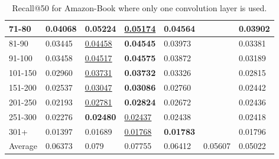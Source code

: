 \begin{table*}[]
\begin{tabular}{|l|l|l|l|l|l|l|}
        71-80     & 0.04068                        & \textbf{0.05224}               & \underline{0.05174}            & 0.04564                        &                                & 0.03902                        \\ \hline
        81-90     & 0.03445                        & \underline{0.04458}            & \textbf{0.04545}               & 0.03973                        &                                & 0.03381                        \\ \hline
        91-100    & 0.03458                        & \underline{0.04517}            & \textbf{0.04575}               & 0.03872                        &                                & 0.03189                        \\ \hline
        101-150   & 0.02960                        & \underline{0.03731}            & \textbf{0.03732}               & 0.03326                        &                                & 0.02815                        \\ \hline
        151-200   & 0.02537                        & \underline{0.03047}            & \textbf{0.03086}               & 0.02760                        &                                & 0.02442                        \\ \hline
        201-250   & 0.02193                        & \underline{0.02781}            & \textbf{0.02824}               & 0.02672                        &                                & 0.02436                        \\ \hline
        251-300   & 0.02276                        & \textbf{0.02480}               & \underline{0.02437}            & 0.02438                        &                                & 0.02418                        \\ \hline
        301+      & 0.01397                        & 0.01689                        & \underline{0.01768}            & \textbf{0.01783}               &                                & 0.01796                        \\ \hline
        Average   & 0.06373                        & 0.079                          & 0.07755                        & 0.06412                        & 0.05607                        & 0.05022                        \\ \hline
    \end{tabular}
    \caption{Recall@50 for Amazon-Book where only one convolution layer is used.}
\end{table*}

